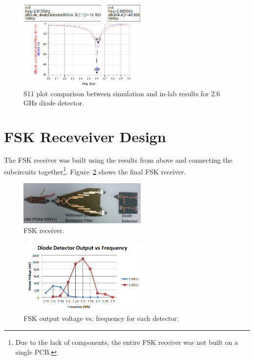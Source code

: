 \documentclass[conference]{IEEEtran}
\begin{document}
\begin{figure}[!htb]
\centering
\includegraphics[width=2.5in]{diode-pics/diodedetectorLab26S11.png}
\caption{S11 plot comparison between simulation and in-lab results for 2.6 GHz diode detector.}
\label{fig:resultS1126}
\end{figure}

\section{FSK Receveiver Design}
The FSK receiver was built using the results from above and connecting the subcircuits together\footnote{Due to the lack of components, the entire FSK receiver was not built on a single PCB.}.  Figure~\ref{fig:fsk} shows the final FSK receiver.

\begin{figure}[!htb]
\centering
\includegraphics[width=2.5in]{fsk.jpg}
\caption{FSK receiver.}
\label{fig:fsk}
\end{figure}

\begin{figure}[!htb]
\centering
\includegraphics[width=2.5in]{diode-pics/output_chart.PNG}
\caption{FSK output voltage vs. frequency for each detector.}
\label{fig:fsk_chart}
\end{figure}
\end{document}
